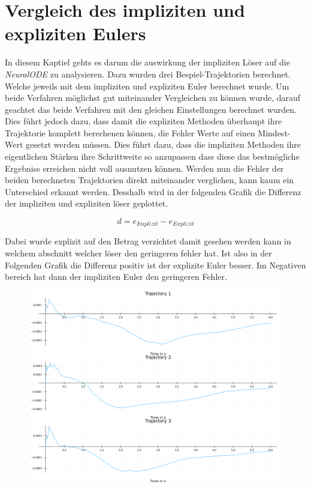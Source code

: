 
\section{Vergleich des impliziten und expliziten Eulers}

In diesem Kaptiel gehts es darum die auswirkung der impliziten Löser auf die \textit{NeuralODE} zu analysieren.
Dazu wurden drei Bespiel-Trajektorien berechnet.
Welche jeweils mit dem impliziten und expliziten Euler berechnet wurde.
Um beide Verfahren möglichst gut miteinander Vergleichen zu können wurde, darauf geachtet das beide Verfahren mit den gleichen Einstellungen berechnet wurden.
Dies führt jedoch dazu, dass damit die expliziten Methoden
überhaupt ihre Trajektorie komplett berechenen können, 
die Fehler Werte auf einen Mindest-Wert gesetzt werden müssen.
Dies führt dazu, dass die impliziten Methoden ihre eigentlichen Stärken ihre Schrittweite so anzupassen 
dass diese das bestmögliche Ergebniss erreichen nicht 
voll ausnutzen können.
Werden nun die Fehler der beiden berechneten Trajektorien
direkt miteinander verglichen, kann kaum ein Unterschied erkannt werden.
Desshalb wird in der folgenden Grafik
die Differenz der impliziten und expliziten löser geplottet.

$$
d = e_{Implizit} - e_{Explizit}
$$

Dabei wurde explizit auf den Betrag verzichtet damit gesehen werden kann in welchem abschnitt welcher löser den geringeren fehler hat.
Ist also in der Folgenden Grafik die Differenz positiv 
ist der explizite Euler besser.
Im Negativen bereich hat dann der impliziten Euler den geringeren Fehler.

\begin{figure}
\includegraphics[width=\textwidth]{Data/03_Ergebnisse/errors.png}
\label{fig:eulervergleich}
\end{figure}

